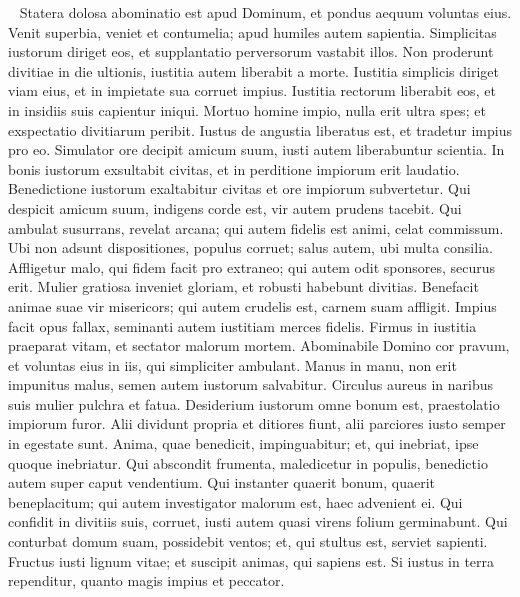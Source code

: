 \begin{biblechapter}   
\verse Statera dolosa abominatio est apud Dominum, et pondus aequum voluntas eius. 
\verse Venit superbia, veniet et contumelia; apud humiles autem sapientia. 
\verse Simplicitas iustorum diriget eos, et supplantatio perversorum vastabit illos. 
\verse Non proderunt divitiae in die ultionis, iustitia autem liberabit a morte. 
\verse Iustitia simplicis diriget viam eius, et in impietate sua corruet impius. 
\verse Iustitia rectorum liberabit eos, et in insidiis suis capientur iniqui. 
\verse Mortuo homine impio, nulla erit ultra spes; et exspectatio divitiarum peribit. 
\verse Iustus de angustia liberatus est, et tradetur impius pro eo. 
\verse Simulator ore decipit amicum suum, iusti autem liberabuntur scientia. 
\verse In bonis iustorum exsultabit civitas, et in perditione impiorum erit laudatio. 
\verse Benedictione iustorum exaltabitur civitas et ore impiorum subvertetur. 
\verse Qui despicit amicum suum, indigens corde est, vir autem prudens tacebit. 
\verse Qui ambulat susurrans, revelat arcana; qui autem fidelis est animi, celat commissum. 
\verse Ubi non adsunt dispositiones, populus corruet; salus autem, ubi multa consilia. 
\verse Affligetur malo, qui fidem facit pro extraneo; qui autem odit sponsores, securus erit. 
\verse Mulier gratiosa inveniet gloriam, et robusti habebunt divitias. 
\verse Benefacit animae suae vir misericors; qui autem crudelis est, carnem suam affligit. 
\verse Impius facit opus fallax, seminanti autem iustitiam merces fidelis. 
\verse Firmus in iustitia praeparat vitam, et sectator malorum mortem. 
\verse Abominabile Domino cor pravum, et voluntas eius in iis, qui simpliciter ambulant. 
\verse Manus in manu, non erit impunitus malus, semen autem iustorum salvabitur. 
\verse Circulus aureus in naribus suis mulier pulchra et fatua. 
\verse Desiderium iustorum omne bonum est, praestolatio impiorum furor. 
\verse Alii dividunt propria et ditiores fiunt, alii parciores iusto semper in egestate sunt. 
\verse Anima, quae benedicit, impinguabitur; et, qui inebriat, ipse quoque inebriatur. 
\verse Qui abscondit frumenta, maledicetur in populis, benedictio autem super caput vendentium. 
\verse Qui instanter quaerit bonum, quaerit beneplacitum; qui autem investigator malorum est, haec advenient ei. 
\verse Qui confidit in divitiis suis, corruet, iusti autem quasi virens folium germinabunt. 
\verse Qui conturbat domum suam, possidebit ventos; et, qui stultus est, serviet sapienti. 
\verse Fructus iusti lignum vitae; et suscipit animas, qui sapiens est. 
\verse Si iustus in terra rependitur, quanto magis impius et peccator. 
\end{biblechapter}

